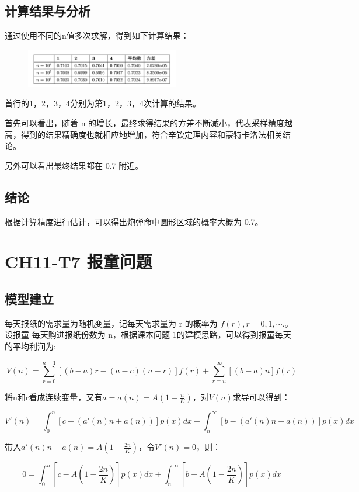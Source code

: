 \documentclass{article}
\begin{document}
\subsection{计算结果与分析}

通过使用不同的n值多次求解，得到如下计算结果：

\begin{figure}[H]
    \centering
    \includegraphics[width=0.6\textwidth]{pic1.png}
\end{figure}

首行的1，2，3，4分别为第1，2，3，4次计算的结果。

首先可以看出，随着 n 的增长，最终求得结果的方差不断减小，代表采样精度越高，得到的结果精确度也就相应地增加，符合辛钦定理内容和蒙特卡洛法相关结论。

另外可以看出最终结果都在 0.7 附近。

\subsection{结论}

根据计算精度进行估计，可以得出炮弹命中圆形区域的概率大概为 0.7。


\section{CH11-T7 报童问题}

\subsection{模型建立}

每天报纸的需求量为随机变量，记每天需求量为 r 的概率为 $f (r), r = 0, 1,\cdots. $。设报童 每天购进报纸份数为 n，根据课本问题 1的建模思路，可以得到报童每天的平均利润为:

$$V(n)=\sum^{n-1}_{r=0}[(b-a)r-(a-c)(n-r)]f(r)+\sum^\infty_{r=n}[(b-a)n]f(r)$$

将n和r看成连续变量，又有$a=a(n)=A(1-\frac nK)$，对$V(n)$求导可以得到：

$$V'(n)=\int^n_0[c-(a'(n)n+a(n))]p(x)dx+\int^\infty_n[b-(a'(n)n+a(n))]p(x)dx$$

带入$a'(n)n+a(n)=A(1-\frac{2n}{K})$，令$V'(n)=0$，则：

$$0=\int^n_0[c-A(1-\frac{2n}{K})]p(x)dx+\int^\infty_n[b-A(1-\frac{2n}{K})]p(x)dx$$
\end{document}
